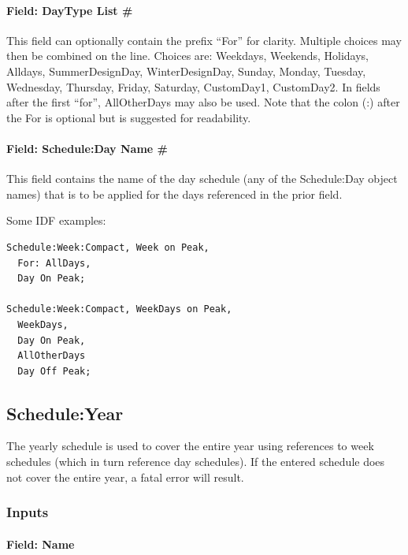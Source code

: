 \paragraph{Field: DayType List \#}\label{field-daytype-list}

This field can optionally contain the prefix ``For'' for clarity. Multiple choices may then be combined on the line. Choices are: Weekdays, Weekends, Holidays, Alldays, SummerDesignDay, WinterDesignDay, Sunday, Monday, Tuesday, Wednesday, Thursday, Friday, Saturday, CustomDay1, CustomDay2. In fields after the first ``for'', AllOtherDays may also be used. Note that the colon (:) after the For is optional but is suggested for readability.

\paragraph{Field: Schedule:Day Name \#}\label{field-scheduleday-name}

This field contains the name of the day schedule (any of the Schedule:Day object names) that is to be applied for the days referenced in the prior field.

Some IDF examples:

\begin{lstlisting}
Schedule:Week:Compact, Week on Peak,
  For: AllDays,
  Day On Peak;

Schedule:Week:Compact, WeekDays on Peak,
  WeekDays,
  Day On Peak,
  AllOtherDays
  Day Off Peak;
\end{lstlisting}

\subsection{Schedule:Year}\label{scheduleyear}

The yearly schedule is used to cover the entire year using references to week schedules (which in turn reference day schedules). If the entered schedule does not cover the entire year, a fatal error will result.

\subsubsection{Inputs}\label{inputs-6-023}

\paragraph{Field: Name}\label{field-name-5-021}

